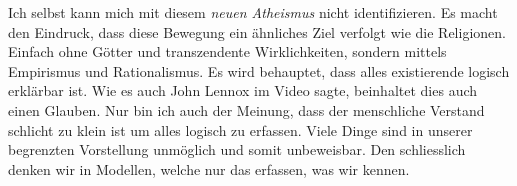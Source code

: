 Ich selbst kann mich mit diesem \textit{neuen Atheismus} nicht identifizieren. Es macht den Eindruck, dass diese Bewegung ein ähnliches Ziel verfolgt wie die Religionen. Einfach ohne Götter und transzendente Wirklichkeiten, sondern mittels Empirismus und Rationalismus. Es wird behauptet, dass alles existierende logisch erklärbar ist. Wie es auch John Lennox im Video sagte, beinhaltet dies auch einen Glauben. Nur bin ich auch der Meinung, dass der menschliche Verstand schlicht zu klein ist um alles logisch zu erfassen. Viele Dinge sind in unserer begrenzten Vorstellung unmöglich und somit unbeweisbar. Den schliesslich denken wir in Modellen, welche nur das erfassen, was wir kennen.\\
